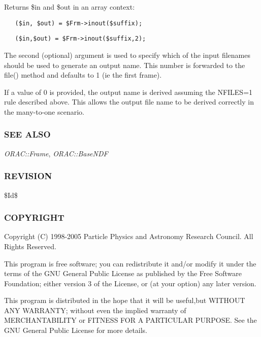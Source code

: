 \begin{description}
Returns \$in and \$out in an array context:

\begin{verbatim}
   ($in, $out) = $Frm->inout($suffix);
\end{verbatim}
\begin{verbatim}
   ($in,$out) = $Frm->inout($suffix,2);
\end{verbatim}


The second (optional) argument is used to specify which of the input
filenames should be used to generate an output name. This number is
forwarded to the file() method and defaults to 1 (ie the first frame).



If a value of 0 is provided, the output name is derived assuming the
NFILES=1 rule described above. This allows the output file name
to be derived correctly in the many-to-one scenario.

\end{description}
\subsubsection*{SEE ALSO\label{ORAC::Frame::NDF_SEE_ALSO}}


\emph{ORAC::Frame}, \emph{ORAC::BaseNDF}

\subsubsection*{REVISION\label{ORAC::Frame::NDF_REVISION}}


\$Id\$

\subsubsection*{COPYRIGHT\label{ORAC::Frame::NDF_COPYRIGHT}}


Copyright (C) 1998-2005 Particle Physics and Astronomy Research
Council. All Rights Reserved.



This program is free software; you can redistribute it and/or modify it under
the terms of the GNU General Public License as published by the Free Software
Foundation; either version 3 of the License, or (at your option) any later
version.



This program is distributed in the hope that it will be useful,but WITHOUT ANY
WARRANTY; without even the implied warranty of MERCHANTABILITY or FITNESS FOR A
PARTICULAR PURPOSE. See the GNU General Public License for more details.



